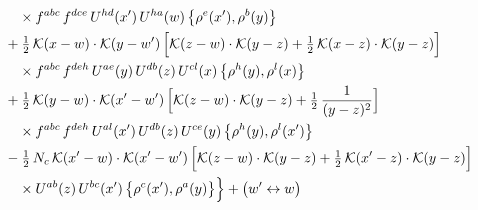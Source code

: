 \documentclass[10pt]{article}
\numberwithin{equation}{section}
\newcommand{\KK}{\mathcal K}
\begin{document}
\begin{align}
&\qquad\times f^{abc}\,f^{dce}\,U^{hd}(x')\,U^{ha}(w)\,\big\{\rho^{e}(x'),\rho^{b}(y)\big\}\notag\\
&\quad +\tfrac12\,\KK(x-w)\cdot\KK(y-w')\,\Big[\KK(z-w)\cdot\KK(y-z)+\tfrac12\,\KK(x-z)\cdot\KK(y-z)\Big]\notag\\
&\qquad\times f^{abc}\,f^{deh}\,U^{ae}(y)\,U^{db}(z)\,U^{cl}(x)\,\big\{\rho^{h}(y),\rho^{l}(x)\big\}\notag\\
&\quad +\tfrac12\,\KK(y-w)\cdot\KK(x'-w')\,\Big[\KK(z-w)\cdot\KK(y-z)+\tfrac12\,\frac{1}{(y-z)^2}\Big]\notag\\
&\qquad\times f^{abc}\,f^{deh}\,U^{al}(x')\,U^{db}(z)\,U^{ce}(y)\,\big\{\rho^{h}(y),\rho^{l}(x')\big\}\notag\\
&\quad -\tfrac12\,N_{c}\,\KK(x'-w)\cdot\KK(x'-w')\,\Big[\KK(z-w)\cdot\KK(y-z)+\tfrac12\,\KK(x'-z)\cdot\KK(y-z)\Big]\notag\\
&\qquad\times U^{ab}(z)\,U^{bc}(x')\,\big\{\rho^{c}(x'),\rho^{a}(y)\big\}\Big\}+\big(w'\leftrightarrow w\big)\label{eq:sum-GIII.II}
\end{align}
\end{document}
